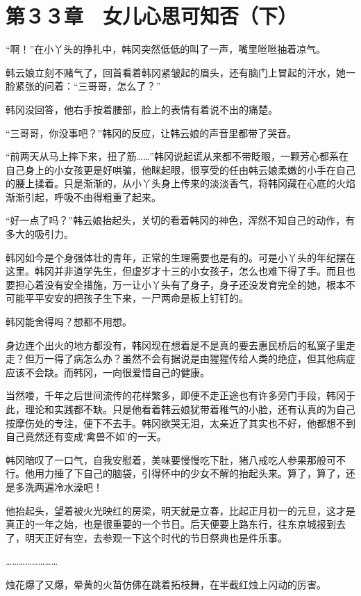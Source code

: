 \section{第３３章　女儿心思可知否（下）}

“啊！”在小丫头的挣扎中，韩冈突然低低的叫了一声，嘴里咝咝抽着凉气。

韩云娘立刻不赌气了，回首看着韩冈紧皱起的眉头，还有脑门上冒起的汗水，她一脸紧张的问着：“三哥哥，怎么了？”

韩冈没回答，他右手按着腰部，脸上的表情有着说不出的痛楚。

“三哥哥，你没事吧？”韩冈的反应，让韩云娘的声音里都带了哭音。

“前两天从马上摔下来，扭了筋……”韩冈说起谎从来都不带眨眼，一颗芳心都系在自己身上的小女孩更是好哄骗，他眯起眼，很享受的任由韩云娘柔嫩的小手在自己的腰上揉着。只是渐渐的，从小丫头身上传来的淡淡香气，将韩冈藏在心底的火焰渐渐引起，呼吸不由得粗重了起来。

“好一点了吗？”韩云娘抬起头，关切的看着韩冈的神色，浑然不知自己的动作，有多大的吸引力。

韩冈如今是个身强体壮的青年，正常的生理需要也是有的。可是小丫头的年纪摆在这里。韩冈并非道学先生，但虚岁才十三的小女孩子，怎么也难下得了手。而且也要担心着没有安全措施，万一让小丫头有了身子，身子还没发育完全的她，根本不可能平平安安的把孩子生下来，一尸两命是板上钉钉的。

韩冈能舍得吗？想都不用想。

身边连个出火的地方都没有，韩冈现在想着是不是真的要去惠民桥后的私窠子里走走？但万一得了病怎么办？虽然不会有据说是由猩猩传给人类的绝症，但其他病症应该不会缺。而韩冈，一向很爱惜自己的健康。

当然喽，千年之后世间流传的花样繁多，即便不走正途也有许多旁门手段，韩冈于此，理论和实践都不缺。只是他看着韩云娘犹带着稚气的小脸，还有认真的为自己按摩伤处的专注，便下不去手。韩冈欲哭无泪，太亲近了其实也不好，他都想不到自己竟然还有变成‘禽兽不如’的一天。

韩冈暗叹了一口气，自我安慰着，美味要慢慢吃下肚，猪八戒吃人参果那般可不行。他用力捶了下自己的脑袋，引得怀中的少女不解的抬起头来。算了，算了，还是多洗两遍冷水澡吧！

他抬起头，望着被火光映红的房梁，明天就是立春，比起正月初一的元旦，这才是真正的一年之始，也是很重要的一个节日。后天便要上路东行，往东京城报到去了，明天正好有空，去参观一下这个时代的节日祭典也是件乐事。

……………………

烛花爆了又爆，晕黄的火苗仿佛在跳着拓枝舞，在半截红烛上闪动的厉害。

